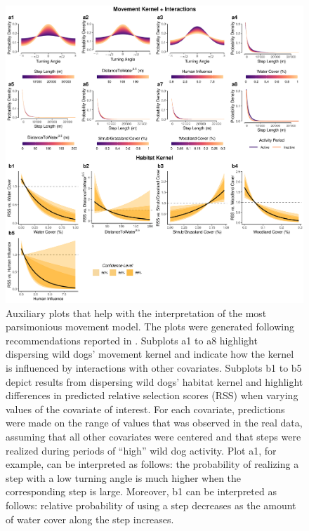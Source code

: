 \documentclass[../FinalThesis.tex]{subfiles}
\begin{document}
\begin{figure}[hbtp]
 \begin{center}
  \includegraphics[width = \textwidth]{Figures/MovementModelInterpretation.png}
  \caption{Auxiliary plots that help with the interpretation of the most
  parsimonious movement model. The plots were generated following
  recommendations reported in \citet{Fieberg.2021}. Subplots a1 to a8 highlight
  dispersing wild dogs' movement kernel and indicate how the kernel is
  influenced by interactions with other covariates. Subplots b1 to b5 depict
  results from dispersing wild dogs' habitat kernel and highlight differences in
  predicted relative selection scores (RSS) when varying values of the covariate
  of interest. For each covariate, predictions were made on the range of values
  that was observed in the real data, assuming that all other covariates were
  centered and that steps were realized during periods of ``high'' wild dog
  activity. Plot a1, for example, can be interpreted as follows: the probability
  of realizing a step with a low turning angle is much higher when the
  corresponding step is large. Moreover, b1 can be interpreted as follows:
  relative probability of using a step decreases as the amount of water cover
  along the step increases.}
  \label{Interpretation}
 \end{center}
\end{figure}
\end{document}
